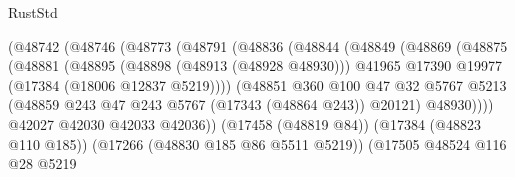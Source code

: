 \begin{lexlean}{RustStd}
\begin{coremodule}
                                    (@48742
                                      (@48746
                                        (@48773
                                          (@48791
                                            (@48836
                                              (@48844
                                                (@48849
                                                  (@48869
                                                    (@48875
                                                      (@48881
                                                        (@48895
                                                          (@48898 (@48913 (@48928 @48930)))
                                                          @41965
                                                          @17390
                                                          @19977
                                                          (@17384 (@18006 @12837 @5219))))
                                                      (@48851
                                                        @360
                                                        @100
                                                        @47
                                                        @32
                                                        @5767
                                                        @5213
                                                        (@48859
                                                          @243
                                                          @47
                                                          @243
                                                          @5767
                                                          (@17343 (@48864 @243))
                                                          @20121)
                                                        @48930))))
                                                @42027
                                                @42030
                                                @42033
                                                @42036))
                                            (@17458 (@48819 @84))
                                            (@17384 (@48823 @110 @185))
                                            (@17266 (@48830 @185 @86 @5511 @5219))
                                            (@17505
                                              @48524
                                              @116
                                              @28
                                              @5219

\end{coremodule}
\end{lexlean}
